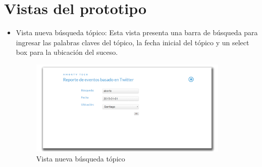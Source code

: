 \section{Vistas del prototipo}	
\begin{itemize}
	\item {Vista nueva búsqueda tópico}: Esta vista presenta una barra de búsqueda para ingresar las palabras claves del tópico, la fecha inicial del tópico y un select box para la ubicación del suceso. 
	\begin{figure}[H]
		\centering
		\includegraphics[width=0.9\textwidth]{imgs/vistas_newsearch.PNG}
		\caption{Vista nueva búsqueda tópico}
		\label{fig:vista_newsearch}
	\end{figure}
	

\end{itemize}
